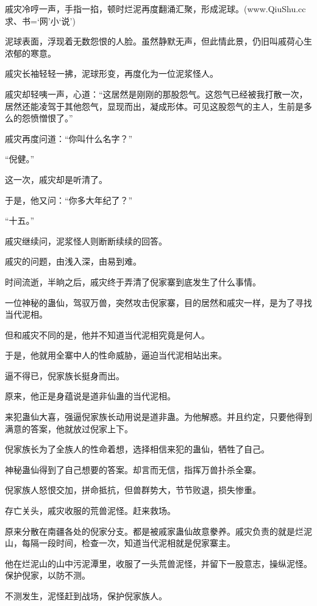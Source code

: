 
\begin{this_body}

戚灾冷哼一声，手指一掐，顿时烂泥再度翻涌汇聚，形成泥球。(www.QiuShu.cc 求、书=‘网’小‘说’)

泥球表面，浮现着无数怨恨的人脸。虽然静默无声，但此情此景，仍旧叫戚荷心生浓郁的寒意。

戚灾长袖轻轻一拂，泥球形变，再度化为一位泥浆怪人。

戚灾却轻咦一声，心道：“这居然是刚刚的那股怨气。这怨气已经被我打散一次，居然还能凌驾于其他怨气，显现而出，凝成形体。可见这股怨气的主人，生前是多么的怨愤憎恨了。”

戚灾再度问道：“你叫什么名字？”

“倪健。”

这一次，戚灾却是听清了。

于是，他又问：“你多大年纪了？”

“十五。”

戚灾继续问，泥浆怪人则断断续续的回答。

戚灾的问题，由浅入深，由易到难。

时间流逝，半晌之后，戚灾终于弄清了倪家寨到底发生了什么事情。

一位神秘的蛊仙，驾驭万兽，突然攻击倪家寨，目的居然和戚灾一样，是为了寻找当代泥相。

但和戚灾不同的是，他并不知道当代泥相究竟是何人。

于是，他就用全寨中人的性命威胁，逼迫当代泥相站出来。

逼不得已，倪家族长挺身而出。

原来，他正是身蕴说是道非仙蛊的当代泥相。

来犯蛊仙大喜，强逼倪家族长动用说是道非蛊。为他解惑。并且约定，只要他得到满意的答案，他就放过倪家上下。

倪家族长为了全族人的性命着想，选择相信来犯的蛊仙，牺牲了自己。

神秘蛊仙得到了自己想要的答案。却言而无信，指挥万兽扑杀全寨。

倪家族人怒恨交加，拼命抵抗，但兽群势大，节节败退，损失惨重。

存亡关头，戚灾收服的荒兽泥怪。赶来救场。

原来分散在南疆各处的倪家分支。都是被戚家蛊仙故意豢养。戚灾负责的就是烂泥山，每隔一段时间，检查一次，知道当代泥相就是倪家寨主。

他在烂泥山的山中污泥潭里，收服了一头荒兽泥怪，并留下一股意志，操纵泥怪。保护倪家，以防不测。

不测发生，泥怪赶到战场，保护倪家族人。


\end{this_body}
